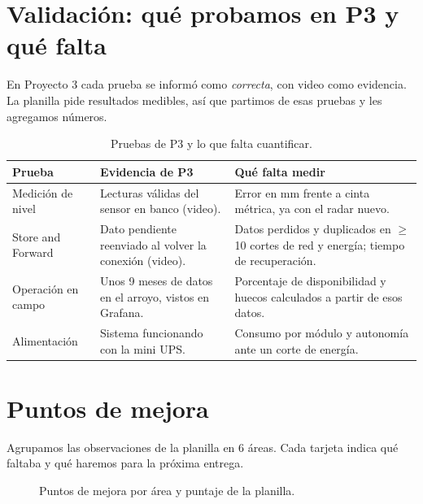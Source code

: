 \documentclass[11pt,a4paper]{article}
\begin{document}
\section{Validación: qué probamos en P3 y qué falta}

En Proyecto 3 cada prueba se informó como \emph{correcta}, con video como
evidencia. La planilla pide resultados medibles, así que partimos de esas
pruebas y les agregamos números.

\begin{table}[H]
    \centering
    \caption{Pruebas de P3 y lo que falta cuantificar.}
    \begin{tabularx}{\textwidth}{>{\raggedright\arraybackslash}p{3.0cm}LL}
        \toprule
        \textbf{Prueba} & \textbf{Evidencia de P3} & \textbf{Qué falta medir} \\
        \midrule
        Medición de nivel & Lecturas válidas del sensor en banco (video). &
            Error en mm frente a cinta métrica, ya con el radar nuevo. \\
        Store and Forward & Dato pendiente reenviado al volver la conexión
            (video). & Datos perdidos y duplicados en $\geq$ 10 cortes de red y
            energía; tiempo de recuperación. \\
        Operación en campo & Unos 9 meses de datos en el arroyo, vistos en
            Grafana. & Porcentaje de disponibilidad y huecos calculados a
            partir de esos datos. \\
        Alimentación & Sistema funcionando con la mini UPS. & Consumo por
            módulo y autonomía ante un corte de energía. \\
        \bottomrule
    \end{tabularx}
\end{table}

\section{Puntos de mejora}

Agrupamos las observaciones de la planilla en 6 áreas. Cada tarjeta indica qué
faltaba y qué haremos para la próxima entrega.

\begin{figure}[H]
    \centering
    \resizebox{0.92\textwidth}{!}{}
    \caption{Puntos de mejora por área y puntaje de la planilla.}
\end{figure}
\end{document}
